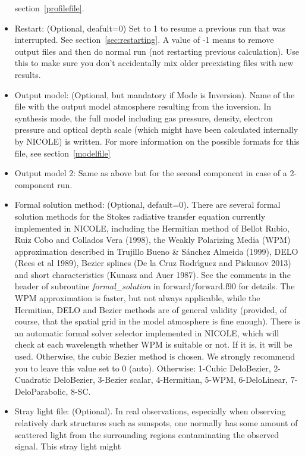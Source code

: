 \begin{itemize}
  section~\ref{profilefile}.
\item Restart: (Optional, deafult=0) Set to 1 to resume a previous run
  that was interrupted. See section~\ref{sec:restarting}. A value of
  -1 means to remove output files and then do normal run (not restarting
  previous calculation). Use this to make sure you don't accidentally mix
  older preexisting files with new results.
\item Output model: (Optional, but mandatory if Mode is Inversion).
  Name of the file with the output model atmosphere resulting from the
  inversion. In synthesis mode, the full model including gas pressure,
  density, electron pressure and optical depth scale (which might have
  been calculated internally by NICOLE) is written.  For more
  information on the possible formats for this file, see
  section~\ref{modelfile}
\item Output model 2: Same as above but for the second component in
  case of a 2-component run.
\item Formal solution method: (Optional, default=0). There are several
  formal solution methods for the Stokes radiative transfer equation
  currently implemented in NICOLE, including the Hermitian method of
  Bellot Rubio, Ruiz Cobo and Collados Vera (1998), the Weakly
  Polarizing Media (WPM) approximation described in Trujillo Bueno \&
  S\'anchez Almeida (1999), DELO (Rees et al 1989), Bezier splines (De
  la Cruz Rodr\'\i guez and Piskunov 2013) and short characteristics
  (Kunasz and Auer 1987). See the comments in the header of subroutine
  {\em formal\_solution} in forward/forward.f90 for details. The WPM
  approximation is faster, but not always applicable, while the
  Hermitian, DELO and Bezier methods are of general validity
  (provided, of course, that the spatial grid in the model atmosphere
  is fine enough). There is an automatic formal solver selector
  implemented in NICOLE, which will check at each wavelength whether
  WPM is suitable or not. If it is, it will be used. Otherwise, the
  cubic Bezier method is chosen. We strongly recommend you to leave
  this value set to 0 (auto). Otherwise: 1-Cubic DeloBezier,
  2-Cuadratic DeloBezier, 3-Bezier scalar, 4-Hermitian, 5-WPM,
  6-DeloLinear, 7-DeloParabolic, 8-SC.
\item Stray light file: (Optional). In real observations, especially
  when observing relatively dark structures such as sunspots, one
  normally has some amount of scattered light from the surrounding
  regions contaminating the observed signal. This stray light might

\end{itemize}
